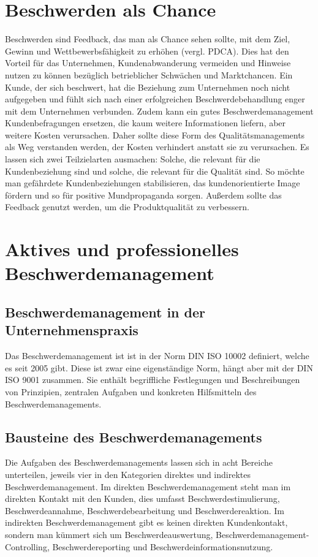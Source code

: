 \documentclass[a4paper,12pt]{article}
\begin{document}
	\section{Beschwerden als Chance}
	Beschwerden sind Feedback, das man als Chance sehen sollte, mit dem Ziel, Gewinn und Wettbewerbsfähigkeit zu erhöhen (vergl. PDCA). Dies hat den Vorteil für das Unternehmen, Kundenabwanderung vermeiden und Hinweise nutzen zu können bezüglich betrieblicher Schwächen und Marktchancen. {\cite{Gabler}} Ein Kunde, der sich beschwert, hat die Beziehung zum Unternehmen noch nicht aufgegeben und fühlt sich nach einer erfolgreichen Beschwerdebehandlung enger mit dem Unternehmen verbunden. Zudem kann ein gutes Beschwerdemanagement Kundenbefragungen ersetzen, die kaum weitere Informationen liefern, aber weitere Kosten verursachen. Daher sollte diese Form des Qualitätsmanagements als Weg verstanden werden, der Kosten verhindert anstatt sie zu verursachen. Es lassen sich zwei Teilzielarten ausmachen: Solche, die relevant für die Kundenbeziehung sind und solche, die relevant für die Qualität sind.
	So möchte man gefährdete Kundenbeziehungen stabilisieren, das kundenorientierte Image fördern und so für positive Mundpropaganda sorgen. Außerdem sollte das Feedback genutzt werden, um die Produktqualität zu verbessern.  {\cite{Gabler}}
	\section{Aktives und professionelles Beschwerdemanagement}
	\subsection{Beschwerdemanagement in der Unternehmenspraxis}
	Das Beschwerdemanagement ist ist in der Norm DIN ISO 10002 definiert, welche es seit 2005 gibt. Diese ist zwar eine eigenständige Norm, hängt aber mit der DIN ISO 9001 zusammen. Sie enthält begriffliche Festlegungen und Beschreibungen von Prinzipien, zentralen Aufgaben und konkreten Hilfsmitteln des Beschwerdemanagements.  {\cite{Gabler}}
	\subsection{Bausteine des Beschwerdemanagements}
	Die Aufgaben des Beschwerdemanagements lassen sich in acht Bereiche unterteilen, jeweils vier in den Kategorien direktes und indirektes Beschwerdemanagement. Im direkten Beschwerdemanagement steht man im direkten Kontakt mit den Kunden, dies umfasst Beschwerdestimulierung, Beschwerdeannahme, Beschwerdebearbeitung und Beschwerdereaktion. Im indirekten Beschwerdemanagement gibt es keinen direkten Kundenkontakt, sondern man kümmert sich um Beschwerdeauswertung, Beschwerdemanagement-Controlling, Beschwerdereporting und Beschwerdeinformationsnutzung.  {\cite{Gabler}}
\end{document}
